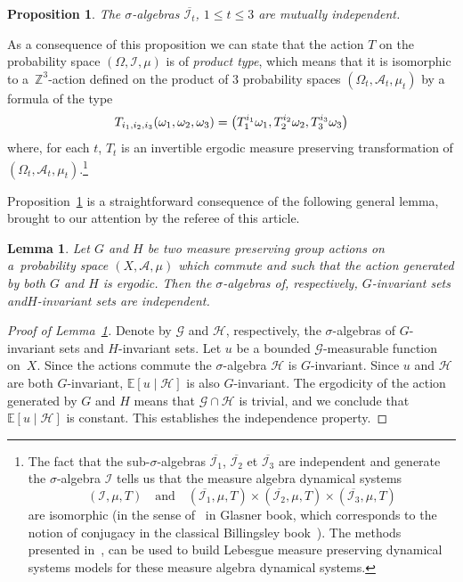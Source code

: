 \documentclass[10pt]{amsart}
\newtheorem{lemm}[theo]{Lemma}\newtheorem{prop}[theo]{Proposition}\newtheorem{coro}[theo]{Corollary}\newtheorem{conj}[theo]{Conjecture}
\theoremstyle{definition}\newtheorem{defi}[theo]{Definition}\newtheorem{rema}[theo]{Remark}\newtheorem{exam}[theo]{Example}\newtheorem{exem}[theo]{Example}\newtheorem{nota}[theo]{Notation}
\newcommand{\Z}{\mathbb{Z}}
\newcommand{\bbE}{\mathbb{E}}
\newcommand*\I{\mathcal{I}}
\newcommand*\A{\mathcal{A}}
\newcommand*\clH{\mathcal{H}}
\newcommand*\G{\mathcal{G}}
\let\originalleft\left
\let\originalright\right
\renewcommand{\left}{\mathopen{}\mathclose\bgroup\originalleft}
\renewcommand{\right}{\aftergroup\egroup\originalright}
\begin{document}
\begin{prop}\label{indep}
The $\sigma$-algebras $\overline{\I_t}$, $1\leq t\leq 3$ are mutually independent.
\end{prop}

As a consequence of this proposition we can state that the action $T$ on the probability space $(\Omega,\I,\mu)$ is of \emph{product type}, which means that it is isomorphic to a~$\Z^3$-action defined on the product of $3$ probability spaces $(\Omega_t,\A_t,\mu_t)$ by a formula of the type
\[
T_{i_1,i_2,i_3}(\omega_1,\omega_2,\omega_3)=
\left(T_1^{i_1}\omega_1,T_2^{i_2}\omega_2,T_3^{i_3}\omega_3\right)
\]
where, for each $t$, $T_t$ is an invertible ergodic measure preserving transformation of $(\Omega_t,\A_t,\mu_t)$.\footnote{The fact that the sub-$\sigma$-algebras $\overline{\I_1}$, $\overline{\I_2}$ et $\overline{\I_3}$ are independent and generate the $\sigma$-algebra $\I$ tells us that the measure algebra dynamical systems
\[
(\I,\mu,T) \quad\text{and}\quad (\overline{\I_1},\mu,T) \times (\overline{\I_2},\mu,T) \times (\overline{\I_3},\mu,T)
\]
are isomorphic (in the sense of~\cite[Definition~2.14]{MR1958753} in Glasner book, which corresponds to the notion of conjugacy in the classical Billingsley book~\cite{MR192027}). The methods presented in~\cite[Chapter~2]{MR1958753}, can be used to build Lebesgue measure preserving dynamical systems models for these measure algebra dynamical systems.}


Proposition~\ref{indep} is a straightforward consequence of the following general lemma, brought to our attention by the referee of this article.

\begin{lemm}\label{lem-indep}
Let $G$ and $H$ be two measure preserving group actions on a~probability space $(X,\A,\mu)$ which commute and such that the action generated by both $G$ and $H$ is ergodic. Then the $\sigma$-algebras of, respectively, $G$-invariant sets and\linebreak $H$-invariant sets are independent.
\end{lemm}

\begin{proof}[Proof of Lemma~\ref{lem-indep}]
Denote by $\G$ and $\clH$, respectively, the $\sigma$-algebras of \linebreak $G$-invariant sets and $H$-invariant sets. Let $u$ be a bounded $\G$-measurable function on~$X$. Since the actions commute the $\sigma$-algebra $\clH$ is $G$-invariant. Since $u$ and $\clH$ are both $G$-invariant, $\bbE[u\mid\clH]$ is also $G$-invariant. The ergodicity of the action generated by $G$ and $H$ means that $\G\cap\clH$ is trivial, and we conclude that $\bbE[u\mid\clH]$ is constant. This establishes the independence property.
\end{proof}
\end{document}
